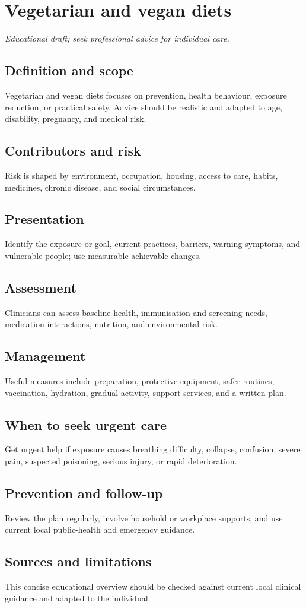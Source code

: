 \chapter{Vegetarian and vegan diets}
\medskip
\noindent\textit{Educational draft; seek professional advice for individual care.}

\section*{Definition and scope}
Vegetarian and vegan diets focuses on prevention, health behaviour, exposure reduction, or practical safety. Advice should be realistic and adapted to age, disability, pregnancy, and medical risk.

\section*{Contributors and risk}
Risk is shaped by environment, occupation, housing, access to care, habits, medicines, chronic disease, and social circumstances.

\section*{Presentation}
Identify the exposure or goal, current practices, barriers, warning symptoms, and vulnerable people; use measurable achievable changes.

\section*{Assessment}
Clinicians can assess baseline health, immunisation and screening needs, medication interactions, nutrition, and environmental risk.

\section*{Management}
Useful measures include preparation, protective equipment, safer routines, vaccination, hydration, gradual activity, support services, and a written plan.

\section*{When to seek urgent care}
Get urgent help if exposure causes breathing difficulty, collapse, confusion, severe pain, suspected poisoning, serious injury, or rapid deterioration.

\section*{Prevention and follow-up}
Review the plan regularly, involve household or workplace supports, and use current local public-health and emergency guidance.

\section*{Sources and limitations}
This concise educational overview should be checked against current local clinical guidance and adapted to the individual.
